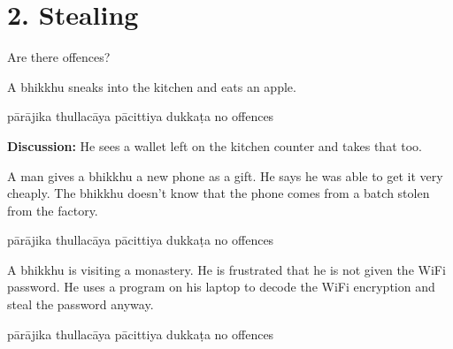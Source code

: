 \chapter{2. Stealing}
\renewcommand*{\theChapterTitle}{2. Stealing}

\begin{exam}{\autoExamName}

\begin{problem*}

  Are there offences?

\begin{parts}

  \item A bhikkhu sneaks into the kitchen and eats an apple.

  \bigskip

  \begin{answers}{5}
    \bChoices
     pārājika\eAns
     thullacāya\eAns
     pācittiya\eAns
     dukkaṭa\eAns
     no offences\eAns
    \eChoices
  \end{answers}

  \bigskip

  \textbf{Discussion:} He sees a wallet left on the kitchen counter and takes that too.

  \bigskip

  \item A man gives a bhikkhu a new phone as a gift. He says he was able to get it very cheaply.
  The bhikkhu doesn't know that the phone comes from a batch stolen from the factory. 

  \bigskip

  \begin{answers}{5}
    \bChoices
     pārājika\eAns
     thullacāya\eAns
     pācittiya\eAns
     dukkaṭa\eAns
     no offences\eAns
    \eChoices
  \end{answers}

  \bigskip

  \item A bhikkhu is visiting a monastery. He is frustrated that he is not given
    the WiFi password. He uses a program on his laptop to decode the WiFi encryption
    and steal the password anyway.

  \bigskip

  \begin{answers}{5}
    \bChoices
     pārājika\eAns
     thullacāya\eAns
     pācittiya\eAns
     dukkaṭa\eAns
     no offences\eAns
    \eChoices
  \end{answers}


\end{parts}
\end{problem*}
\end{exam}
